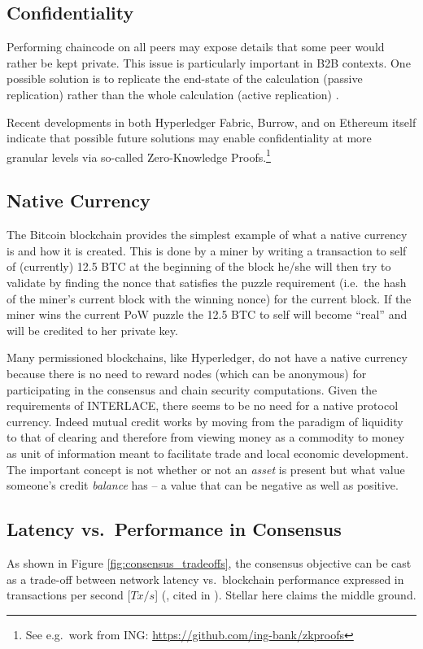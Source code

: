 \subsection{Confidentiality}
Performing chaincode on all peers may expose details that some peer would rather be kept private. This issue is particularly important in B2B contexts. One possible solution is to replicate the end-state of the calculation (passive replication) rather than the whole calculation (active replication) \cite{AndroulakiEtAl2018}.

Recent developments in both Hyperledger Fabric, Burrow, and on Ethereum itself indicate that possible future solutions may enable confidentiality at more granular levels via so-called Zero-Knowledge Proofs.\footnote{See e.g.\ work from ING: \url{https://github.com/ing-bank/zkproofs}}

\subsection{Native Currency}
The Bitcoin blockchain provides the simplest example of what a native currency is and how it is created. This is done by a miner by writing a transaction to self of (currently) 12.5 BTC at the beginning of the block he/she will then try to validate by finding the nonce that satisfies the puzzle requirement (i.e.\ the hash of the miner's current block with the winning nonce) for the current block. If the miner wins the current PoW puzzle the 12.5 BTC to self will become ``real'' and will be credited to her private key.

Many permissioned blockchains, like Hyperledger, do not have a native currency because there is no need to reward nodes (which can be anonymous) for participating in the consensus and chain security computations. Given the requirements of INTERLACE, there seems to be no need for a native protocol currency. Indeed mutual credit works by moving from the paradigm of liquidity to that of clearing and therefore from viewing money as a commodity to money as unit of information meant to facilitate trade and local economic development. The important concept is not whether or not an \emph{asset} is present but what value someone's credit \emph{balance} has -- a value that can be negative as well as positive.


\subsection{Latency vs.\ Performance in Consensus}
As shown in Figure \ref{fig:consensus_tradeoffs}, the consensus objective can be cast as a trade-off between network latency vs.\ blockchain performance expressed in transactions per second [$Tx/s$] (\cite{vukolic2015}, cited in \cite{AndroulakiEtAl2018}). Stellar here claims the middle ground.


